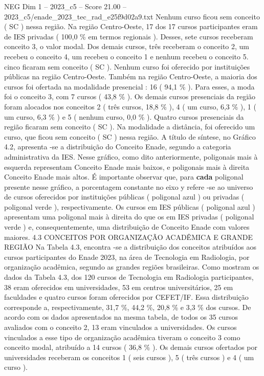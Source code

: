 \begin{textsample}{NEG Dim 1 – 2023\_c5 – Score 21.00 – 2023\_c5/enade\_2023\_tec\_rad\_e25f9d02a9.txt}
Nenhum curso ficou sem conceito ( SC ) nessa região.
Na região Centro-Oeste, 17 dos 17 cursos participantes eram de IES privadas ( 100,0 \% em termos regionais ).
Desses, sete cursos receberam conceito 3, o valor modal.
Dos demais cursos, três receberam o conceito 2, um recebeu o conceito 4, um recebeu o conceito 1 e nenhum recebeu o conceito 5. cinco ficaram sem conceito ( SC ).
Nenhum curso foi oferecido por instituições públicas na região Centro-Oeste.
Também na região Centro-Oeste, a maioria dos cursos foi ofertada na modalidade presencial : 16 ( 94,1 \% ).
Para esses, a moda foi o conceito 3, com 7 cursos ( 43,8 \% ).
Os demais cursos presenciais da região foram alocados nos conceitos 2 ( três cursos, 18,8 \% ), 4 ( um curso, 6,3 \% ), 1 ( um curso, 6,3 \% ) e 5 ( nenhum curso, 0,0 \% ).
Quatro cursos presenciais da região ficaram sem conceito ( SC ).
Na modalidade a distância, foi oferecido um curso, que ficou sem conceito ( SC ) nessa região.
A título de síntese, no Gráfico 4.2, apresenta -se a distribuição do Conceito Enade, segundo a categoria administrativa da IES.
Nesse gráfico, como dito anteriormente, poligonais mais à esquerda representam Conceito Enade mais baixos, e poligonais mais à direita Conceito Enade mais altos.
É importante observar que, para \textbf{cada} poligonal presente nesse gráfico, a porcentagem constante no eixo y refere -se ao universo de cursos oferecidos por instituições públicas ( poligonal azul ) ou privadas ( poligonal verde ), respectivamente.
Os cursos em IES públicas ( poligonal azul ) apresentam uma poligonal mais à direita do que os em IES privadas ( poligonal verde ) e, consequentemente, uma distribuição de Conceito Enade com valores maiores. 4.3 CONCEITOS POR ORGANIZAÇÃO ACADÊMICA E GRANDE REGIÃO Na Tabela 4.3, encontra -se a distribuição dos conceitos atribuídos aos cursos participantes do Enade 2023, na área de Tecnologia em Radiologia, por organização acadêmica, segundo as grandes regiões brasileiras.
Como mostram os dados da Tabela 4.3, dos 120 cursos de Tecnologia em Radiologia participantes, 38 eram oferecidos em universidades, 53 em centros universitários, 25 em faculdades e quatro cursos foram oferecidos por CEFET/IF.
Essa distribuição corresponde a, respectivamente, 31,7 \%, 44,2 \%, 20,8 \% e 3,3 \% dos cursos.
De acordo com os dados apresentados na mesma tabela, de todos os 35 cursos avaliados com o conceito 2, 13 eram vinculados a universidades.
Os cursos vinculados a esse tipo de organização acadêmica tiveram o conceito 3 como conceito modal, atribuído a 14 cursos ( 36,8 \% ).
Os demais cursos ofertados por universidades receberam os conceitos 1 ( seis cursos ), 5 ( três cursos ) e 4 ( um curso ).

\end{textsample}
